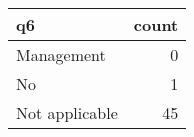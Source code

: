 \begin{tabular}{lr}
\toprule
             q6 &  count \\
\midrule
     Management &      0 \\
             No &      1 \\
 Not applicable &     45 \\
\bottomrule
\end{tabular}
